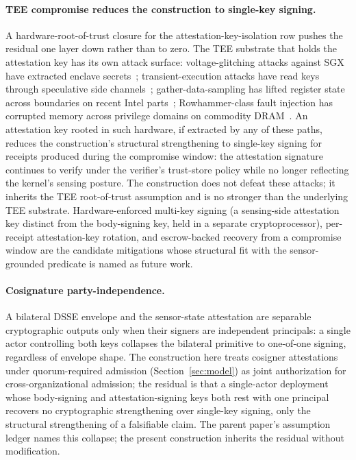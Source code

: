 \paragraph{TEE compromise reduces the construction to single-key signing.}
A hardware-root-of-trust closure for the attestation-key-isolation row pushes the residual one layer down rather than to zero. The TEE substrate that holds the attestation key has its own attack surface: voltage-glitching attacks against SGX have extracted enclave secrets~\cite{murdockPlundervolt2020}; transient-execution attacks have read keys through speculative side channels~\cite{vanbulckForeshadow2018}; gather-data-sampling has lifted register state across boundaries on recent Intel parts~\cite{moghimiDownfall2024}; Rowhammer-class fault injection has corrupted memory across privilege domains on commodity DRAM~\cite{koglerHalfDouble2022}. An attestation key rooted in such hardware, if extracted by any of these paths, reduces the construction's structural strengthening to single-key signing for receipts produced during the compromise window: the attestation signature continues to verify under the verifier's trust-store policy while no longer reflecting the kernel's sensing posture. The construction does not defeat these attacks; it inherits the TEE root-of-trust assumption and is no stronger than the underlying TEE substrate. Hardware-enforced multi-key signing (a sensing-side attestation key distinct from the body-signing key, held in a separate cryptoprocessor), per-receipt attestation-key rotation, and escrow-backed recovery from a compromise window are the candidate mitigations whose structural fit with the sensor-grounded predicate is named as future work.

\paragraph{Cosignature party-independence.}
A bilateral DSSE envelope and the sensor-state attestation are separable cryptographic outputs only when their signers are independent principals: a single actor controlling both keys collapses the bilateral primitive to one-of-one signing, regardless of envelope shape. The construction here treats cosigner attestations under quorum-required admission (Section~\ref{sec:model}) as joint authorization for cross-organizational admission; the residual is that a single-actor deployment whose body-signing and attestation-signing keys both rest with one principal recovers no cryptographic strengthening over single-key signing, only the structural strengthening of a falsifiable claim. The parent paper's assumption ledger names this collapse; the present construction inherits the residual without modification.

